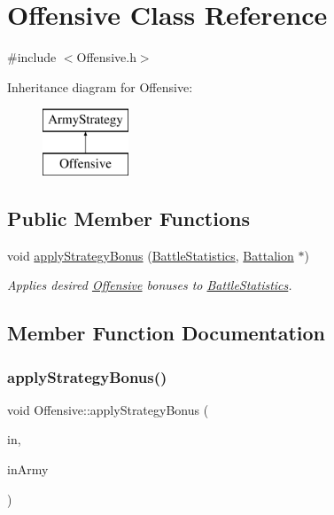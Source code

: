 \hypertarget{class_offensive}{}\section{Offensive Class Reference}
\label{class_offensive}


{\ttfamily \#include $<$Offensive.\+h$>$}

Inheritance diagram for Offensive\+:\begin{figure}[H]
\begin{center}
\leavevmode
\includegraphics[height=2.000000cm]{class_offensive}
\end{center}
\end{figure}
\subsection*{Public Member Functions}
\begin{DoxyCompactItemize}
\item 
void \mbox{\hyperlink{class_offensive_aaaaf9b44b3fa438b5067c01463b3353a}{apply\+Strategy\+Bonus}} (\mbox{\hyperlink{class_battle_statistics}{Battle\+Statistics}}, \mbox{\hyperlink{class_battalion}{Battalion}} $\ast$)
\begin{DoxyCompactList}\small\item\em Applies desired \mbox{\hyperlink{class_offensive}{Offensive}} bonuses to \mbox{\hyperlink{class_battle_statistics}{Battle\+Statistics}}. \end{DoxyCompactList}\end{DoxyCompactItemize}


\subsection{Member Function Documentation}
\mbox{\label{class_offensive_aaaaf9b44b3fa438b5067c01463b3353a}} 
\subsubsection{\texorpdfstring{applyStrategyBonus()}{applyStrategyBonus()}}
{\footnotesize\ttfamily void Offensive\+::apply\+Strategy\+Bonus (\begin{DoxyParamCaption}\item[{\mbox{\hyperlink{class_battle_statistics}{Battle\+Statistics}}}]{in,  }\item[{\mbox{\hyperlink{class_battalion}{Battalion}} $\ast$}]{in\+Army }\end{DoxyParamCaption})\hspace{0.3cm}{\ttfamily [virtual]}}



